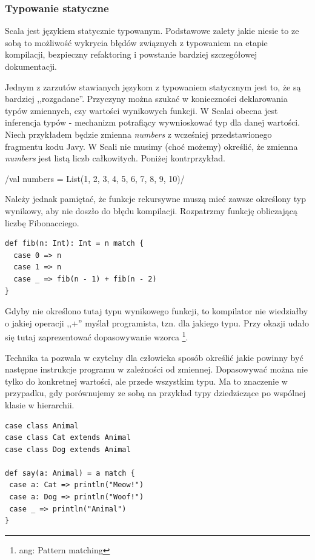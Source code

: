 \documentclass[brudnopis]{xmgr}
\begin{document}
\subsubsection{Typowanie statyczne}

Scala jest językiem statycznie typowanym. Podstawowe zalety jakie niesie to ze sobą to możliwość wykrycia błędów związnych z typowaniem na etapie kompilacji, bezpieczny refaktoring i powstanie bardziej szczegółowej dokumentacji. 

Jednym z zarzutów stawianych językom z typowaniem statycznym jest to, że są bardziej ,,rozgadane''. Przyczyny można szukać w konieczności deklarowania typów zmiennych, czy wartości wynikowych funkcji. W Scalai obecna jest inferencja typów - mechanizm potrafiący wywnioskować typ dla danej wartości. Niech przykładem będzie zmienna \emph{numbers} z wcześniej przedstawionego fragmentu kodu Javy. W Scali nie musimy (choć możemy) określić, że zmienna \emph{numbers} jest listą liczb całkowitych. Poniżej kontrprzykład.

/val numbers = List(1, 2, 3, 4, 5, 6, 7, 8, 9, 10)/

Należy jednak pamiętać, że funkcje rekursywne muszą mieć zawsze określony typ wynikowy, aby nie doszło do błędu kompilacji. Rozpatrzmy funkcję obliczającą liczbę Fibonacciego.

\begin{verbatim}
def fib(n: Int): Int = n match {
  case 0 => n
  case 1 => n
  case _ => fib(n - 1) + fib(n - 2)
}
\end{verbatim}

Gdyby nie określono tutaj typu wynikowego funkcji, to kompilator nie wiedziałby o jakiej operacji ,,+'' myślał programista, tzn. dla jakiego typu. Przy okazji udało się tutaj zaprezentować dopasowywanie wzorca \footnote{ang: Pattern matching}.

Technika ta pozwala w czytelny dla człowieka sposób określić jakie powinny być następne instrukcje programu w zależności od zmiennej. Dopasowywać można nie tylko do konkretnej wartości, ale przede wszystkim typu. Ma to znaczenie w przypadku, gdy porównujemy ze sobą na przykład typy dziedziczące po wspólnej klasie w hierarchii.

\begin{verbatim}
case class Animal
case class Cat extends Animal
case class Dog extends Animal

def say(a: Animal) = a match {
 case a: Cat => println("Meow!")
 case a: Dog => println("Woof!")
 case _ => println("Animal")
}
\end{verbatim}
\end{document}
